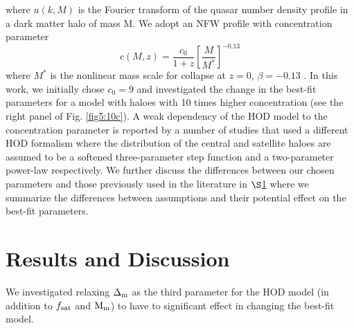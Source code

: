 \documentclass[useAMS,usenatbib]{mn2e}
\begin{document}
where $u(k,M)$ is the Fourier transform of the quasar number density profile in 
a dark matter halo of mass M. We adopt an NFW profile \citep{nfw97} with 
concentration parameter
\begin{equation}
c(M,z) = \frac{c_{0}}{1+z}[\frac{M}{M^{*}}]^{-0.13}
\end{equation}
 where $M^{*}$ is the nonlinear mass scale for collapse at $z=0$, $\beta = 
-0.13$ \citep{cs02}. In this work, we initially chose $c_0=9$ and investigated 
the change in the best-fit parameters for a model with haloes with 10 times 
higher concentration (see the right panel of Fig. \ref{fig5:10c}). A weak 
dependency of the HOD model to the concentration parameter is reported by a 
number of studies \citep{ric12,ric13,sh13} that used a different HOD formalism 
where the distribution of the central and satellite haloes are assumed to be a 
softened three-parameter step function and a two-parameter power-law 
respectively.
 We further discuss the differences between our chosen parameters and those 
previously used in the literature in $\S$\ref{res} where we summarize the 
differences between assumptions and their potential effect on the best-fit 
parameters.    

\section{Results and Discussion}\label{res}
 We investigated relaxing $\Delta_{\rm m}$ as the third parameter 
for the HOD model (in addition to $f_{\rm sat}$ and $\rm M_{m}$) to have to significant effect in changing the best-fit model.
\end{document}
